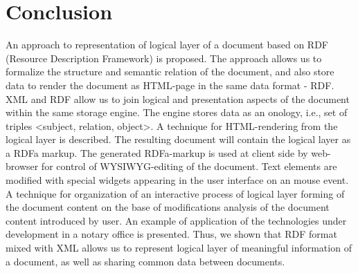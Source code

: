 \documentclass[conference]{IEEEtran}
\begin{document}
%





\section{Conclusion}
An approach to representation of logical layer of a document based on RDF (Resource Description Framework) is proposed. The approach allows us to formalize the structure and semantic relation of the document, and also store data to render the document as HTML-page in the same data format - RDF. XML and RDF allow us to join logical and presentation aspects of the document within the same storage engine. The engine stores data as an onology, i.e., set of triples <subject, relation, object>. A technique for HTML-rendering from the logical layer is described. The resulting document will contain the logical layer as a RDFa markup. The generated RDFa-markup is used at client side by web-browser for control of WYSIWYG-editing of the document. Text elements are modified with special widgets appearing in the user interface on an mouse event. A technique for organization of an interactive process of logical layer forming of the document content on the base of modifications analysis of the document content introduced by user. An example of application of the technologies under development in a notary office is presented. Thus, we shown that RDF format mixed with XML allows us to represent logical layer of meaningful information of a document, as well as sharing common data between documents.
\end{document}
